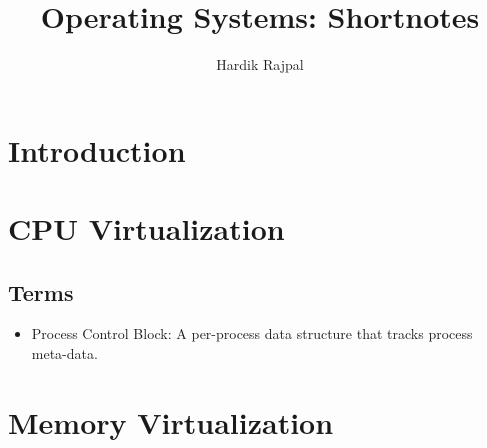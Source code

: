 \documentclass[10pt]{report}
\title{Operating Systems: Shortnotes}
\author{Hardik Rajpal}
\begin{document}
\maketitle
\tableofcontents
\pagebreak
\chapter{Introduction}
\chapter{CPU Virtualization}
\section*{Terms}
\begin{itemize}
\item Process Control Block: A per-process data structure that tracks process meta-data.
\end{itemize}
\chapter{Memory Virtualization}
\end{document}
